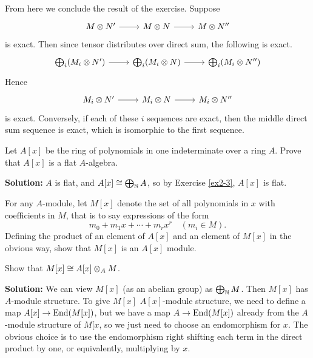 \documentclass{article}
\begin{document}
From here we conclude the result of the exercise.
Suppose
\[
    \begin{tikzcd}
        M \tensor N' \arrow[r] & M \tensor N \arrow[r] & M \tensor N''
    \end{tikzcd}
\]
is exact.
Then since tensor distributes over direct sum, the following is exact.
\[
    \begin{tikzcd}
        \bigoplus_i (M_i \tensor N') \arrow[r] & \bigoplus_i (M_i \tensor N) \arrow[r] & \bigoplus_i (M_i \tensor N'')
    \end{tikzcd}
\]
Hence
\[
    \begin{tikzcd}
        M_i \tensor N' \arrow[r] & M_i \tensor N \arrow[r] & M_i \tensor N''
    \end{tikzcd}
\]
is exact.
Conversely, if each of these \(i\) sequences are exact, then the middle direct sum sequence is exact, which is isomorphic to the first sequence.

\begin{exercise} \label{ex2-5}
    Let \(A[x]\) be the ring of polynomials in one indeterminate over a ring \(A\).
    Prove that \(A[x]\) is a flat \(A\)-algebra.
\end{exercise}

\noindent\textbf{Solution:}
\(A\) is flat, and \(A[x] \cong \bigoplus_{\mathbb{N}} A\), so by Exercise \ref{ex2-3}, \(A[x]\) is flat.

\begin{exercise} \label{ex2-6}
    For any \(A\)-module, let \(M[x]\) denote the set of all polynomials in \(x\) with coefficients in \(M\), that is to say expressions of the form
    \[
        m_0 + m_1 x + \cdots + m_r x^r \quad (m_i \in M).
    \]
    Defining the product of an element of \(A[x]\) and an element of \(M[x]\) in the obvious way, show that \(M[x]\) is an \(A[x]\) module.

    Show that \(M[x] \cong A[x] \otimes_A M\).
\end{exercise}

\noindent\textbf{Solution:}
We can view \(M[x]\) (as an abelian group) as \(\bigoplus_{\mathbb{N}} M\).
Then \(M[x]\) has \(A\)-module structure.
To give \(M[x]\) \(A[x]\)-module structure, we need to define a map \(A[x] \to \operatorname{End}(M[x])\), but we have a map \(A \to \operatorname{End}(M[x])\) already from the \(A\)-module structure of \(M[x\), so we just need to choose an endomorphism for \(x\).
The obvious choice is to use the endomorphism right shifting each term in the direct product by one, or equivalently, multiplying by \(x\).
\end{document}
